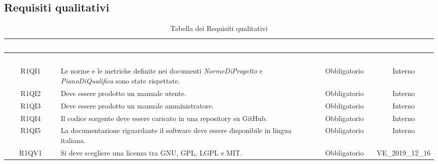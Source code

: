 \subsection{Requisiti qualitativi}
{
\renewcommand{\arraystretch}{1.5}
\centering
\begin{longtable}{ c C{8cm} c c}
\caption{Tabella dei Requisiti qualitativi}\\
\textcolor{white}{\textbf{Identificativo}} & \textcolor{white}{\textbf{Descrizione}} & \textcolor{white}{\textbf{Classificazione}} & \textcolor{white}{\textbf{Fonti}}\\	
\endfirsthead
{}
\textcolor{white}{\textbf{Identificativo}} & \textcolor{white}{\textbf{Descrizione}} & \textcolor{white}{\textbf{Classificazione}} & \textcolor{white}{\textbf{Fonti}}\\
\endhead

R1QI1 & Le norme e le metriche definite nei documenti \textit{NormeDiProgetto} e \textit{PianoDiQualifica} sono state rispettate. & Obbligatorio & Interno\\

R1QI2 & Deve essere prodotto un manuale utente. & Obbligatorio & Interno\\

R1QI3 & Deve essere prodotto un manuale amministratore. & Obbligatorio & Interno\\

R1QI4 & Il codice sorgente deve essere caricato in una repository su GitHub. & Obbligatorio & Interno\\

R1QI5 & La documentazione riguardante il software deve essere disponibile in lingua italiana. & Obbligatorio & Interno\\

R1QV1 & Si deve scegliere una licenza tra GNU, GPL, LGPL e MIT. & Obbligatorio & VE\_2019\_12\_16 \\

\end{longtable}
}